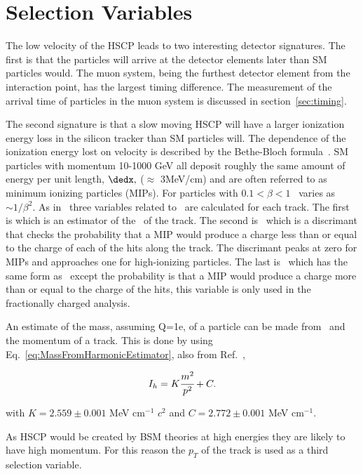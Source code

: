 \section{Selection Variables}
The low velocity of the HSCP leads to two interesting detector signatures. The first is that the particles will arrive at the detector elements later than SM particles would.
The muon system, being the furthest detector element from the interaction point, has the largest timing difference. The measurement of the arrival time of particles in the
muon system is discussed in section~\ref{sec:timing}.

The second signature is that a slow moving HSCP will have a larger ionization energy loss in the silicon tracker than SM particles will.
The dependence of the ionization energy lost on velocity is described by the Bethe-Bloch formula~\cite{PDG}. SM particles with momentum 10-1000 GeV all deposit
roughly the same amount of energy per unit length, $\dedx,$ ($\approx$ 3MeV/cm) and are often referred to as minimum ionizing particles (MIPs).
For particles with $0.1 < \beta < 1$ \dedx\ varies as $\sim 1/\beta^2$.
As in~\cite{2012PAS} three variables related to \dedx\ are calculated for each track. The first is \ih which is an estimator of the \dedx\ of the track.
The second is \ias\ which is a discrimant that checks the probability that a MIP would produce a charge less than or equal to the charge of each of the hits
along the track. The discrimant peaks at zero for MIPs and approaches one for high-ionizing particles. The last is \iasp\ which has the same form as \ias\ except
the probability is that a MIP would produce a charge more than or equal to the charge of the hits, this variable is only used in the fractionally charged analysis.

An estimate of the mass, assuming Q=1e, of a particle can be made from \ih\ and the momentum of a track. This is done by using Eq.~\ref{eq:MassFromHarmonicEstimator},
also from Ref.~\cite{2011HSCP},

\begin{equation}
I_h= K\cfrac{m^2}{p^2}+C.
\label{eq:MassFromHarmonicEstimator}
\end{equation}

with  $K=2.559 \pm 0.001$ MeV cm$^{-1}$ $c^2$ and
$C=2.772 \pm 0.001$ MeV cm$^{-1}$.

As HSCP would be created by BSM theories at high energies they are likely to have high momentum. For this reason the $p_T$ of the track is used as a third
selection variable. 

